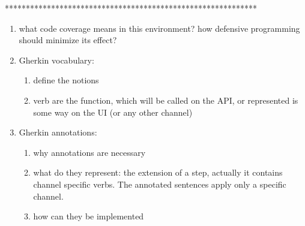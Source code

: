 \documentclass[conference]{IEEEtran}
\begin{document}
************************************************************

\begin{enumerate}
    \item what code coverage means in this environment? how defensive programming should minimize its effect?
    \item Gherkin vocabulary:
        \begin{enumerate}
            \item define the notions
            \item verb are the function, which will be called on the API, or represented is some way on the UI (or any other channel)
        \end{enumerate}
    \item Gherkin annotations:
        \begin{enumerate}
            \item why annotations are necessary
            \item what do they represent: the extension of a step, actually it contains channel specific verbs. The annotated sentences apply only a specific channel.
            \item how can they be implemented

\end{enumerate}
\end{enumerate}
\end{document}
